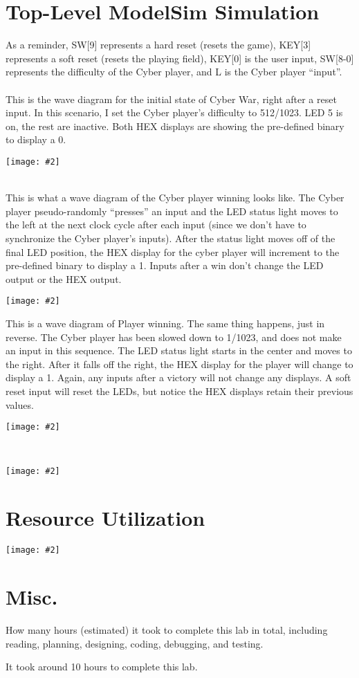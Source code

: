 \documentclass{article}
\newenvironment{solution}{\begin{mdframed}[style=SolutionFrame]}{\end{mdframed}}
\newcommand{\img}[2][1.0]{
    \begin{minipage}[t]{0.9\linewidth}
        \begin{center}
            \texttt{[image: \#2]}
        \end{center}
    \end{minipage}
}
\begin{document}
\section{Top-Level ModelSim Simulation}
    \begin{solution}
        As a reminder, SW[9] represents a hard reset (resets the game), KEY[3] represents a soft reset (resets the playing field), KEY[0] is the user input, SW[8-0] represents the difficulty of the Cyber player, and L is the Cyber player ``input''. \\~\\
        This is the wave diagram for the initial state of Cyber War, right after a reset input. In this scenario, I set the Cyber player's difficulty to 512/1023. LED 5 is on, the rest are inactive. Both HEX displays are showing the pre-defined binary to display a 0. \\
        \img{war_init.png} \\
        This is what a wave diagram of the Cyber player winning looks like. The Cyber player pseudo-randomly ``presses'' an input and the LED status light moves to the left at the next clock cycle after each input (since we don't have to synchronize the Cyber player's inputs). After the status light moves off of the final LED position, the HEX display for the cyber player will increment to the pre-defined binary to display a 1. Inputs after a win don't change the LED output or the HEX output. \\
        \img{cyber_win.png}
        \newpage
        This is a wave diagram of Player winning. The same thing happens, just in reverse. The Cyber player has been slowed down to 1/1023, and does not make an input in this sequence. The LED status light starts in the center and moves to the right. After it falls off the right, the HEX display for the player will change to display a 1. Again, any inputs after a victory will not change any displays. A soft reset input will reset the LEDs, but notice the HEX displays retain their previous values. \\
        \img{player_win_1.png} \\
        \img{player_win_2.png}
    \end{solution}

\section{Resource Utilization}
    \begin{solution}
        \img{resources.png}
    \end{solution}

\section{Misc.}
    How many hours (estimated) it took to complete this lab in total, including reading, planning, designing, coding, debugging, and testing.
    \begin{solution}
        It took around 10 hours to complete this lab.
    \end{solution}
\end{document}
